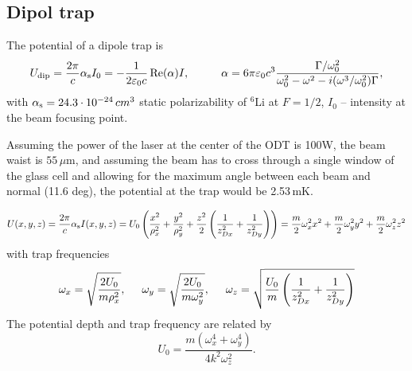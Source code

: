 \subsection*{Dipol trap} 

The potential of a dipole trap is
\begin{equation}
	\sub{U}{dip} = \frac{2\pi}{c} \sub{\alpha}{s} I_0 = -\frac{1}{2 \varepsilon_0 c} \Re(\alpha) I,
	\hspace{10 mm} 
	\alpha = 6 \pi \varepsilon_0 c^3 \frac{\Gamma/\omega_0^2}{\omega_0^2 - \omega^2 - i (\omega^3 / \omega_0^2) \Gamma},
\end{equation}
with $\alpha_{\textnormal{s}} = 24.3 \cdot 10^{-24}\,cm^{3}$ static polarizability of $^{6}$Li at $F = 1/2$, $I_0$ -- intensity at the beam focusing point.


Assuming the power of the laser at the center of the ODT is 100W, the beam waist is $55\, \mu$m, and assuming the beam has to cross through a single window of the glass cell and allowing for the maximum angle between each beam and normal (11.6 deg), the potential at the trap would be 2.53\,mK.


\begin{equation*}
	U(x,y,z) = \frac{2\pi}{c} \alpha_{\textnormal{s}} I(x, y,z) = U_0 \left(
		\frac{x^2}{\rho_x^2} + \frac{y^2}{\rho_y^2} + \frac{z^2}{2} \left(\frac{1}{z_{Dx}^2} + \frac{1}{z_{Dy}^2}\right)
	\right) = \frac{m}{2}\omega_x^2 x^2 + \frac{m}{2} \omega_y^2 y^2 + \frac{m}{2} \omega_z^2 z^2
\end{equation*}
with trap frequencies
\begin{equation*}
	\omega_x = \sqrt{\frac{2U_0}{m \rho_x^2}},
	\hspace{5 mm} 
	\omega_y = \sqrt{\frac{2 U_0}{m \omega_y^2}},
	\hspace{5 mm} 
	\omega_z = \sqrt{\frac{U_0}{m}\left(
		\frac{1}{z_{Dx}^2} + \frac{1}{z_{Dy}^2}
	\right)}
\end{equation*}
The potential depth and trap frequency are related by 
\begin{equation*}
	U_0 = \frac{m(\omega_x^4 + \omega_y^4)}{4 k^2 \omega_z^2}.
\end{equation*}